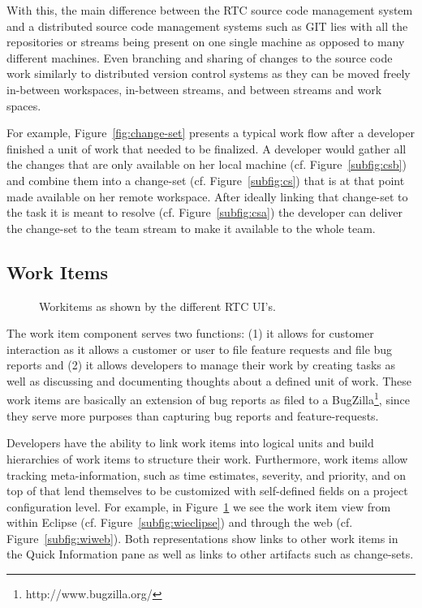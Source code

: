 With this, the main difference between the RTC source code management system and a distributed source code management systems such as GIT lies with all the repositories or streams being present on one single machine as opposed to many different machines.
Even branching and sharing of changes to the source code work similarly to distributed version control systems as they can be moved freely in-between workspaces, in-between streams, and between streams and work spaces.

For example, Figure~\ref{fig:change-set} presents a typical work flow after a developer finished a unit of work that needed to be finalized.
A developer would gather all the changes that are only available on her local machine (cf. Figure~\ref{subfig:csb}) and combine them into a change-set (cf. Figure~\ref{subfig:cs}) that is at that point made available on her remote workspace.
After ideally linking that change-set to the task it is meant to resolve (cf. Figure~\ref{subfig:csa}) the developer can deliver the change-set to the team stream to make it available to the whole team.

\subsection{Work Items}
\begin{figure}
\centering
{}

\caption{Workitems as shown by the different RTC UI's.}
\label{fig:wi}
\end{figure}
The work item component serves two functions: (1) it allows for customer interaction as it allows a customer or user to file feature requests and file bug reports and (2) it allows developers to manage their work by creating tasks as well as discussing and documenting thoughts about a defined unit of work.
These work items are basically an extension of bug reports as filed to a BugZilla\footnote{http://www.bugzilla.org/}, since they serve more purposes than capturing bug reports and feature-requests.

Developers have the ability to link work items into logical units and build hierarchies of work items to structure their work.
Furthermore, work items allow tracking meta-information, such as time estimates, severity, and priority, and on top of that lend themselves to be customized with self-defined fields on a project configuration level.
For example, in Figure~\ref{fig:wi} we see the work item view from within Eclipse (cf. Figure~\ref{subfig:wieclipse}) and through the web (cf. Figure~\ref{subfig:wiweb}).
Both representations show links to other work items in the Quick Information pane as well as links to other artifacts such as change-sets.

